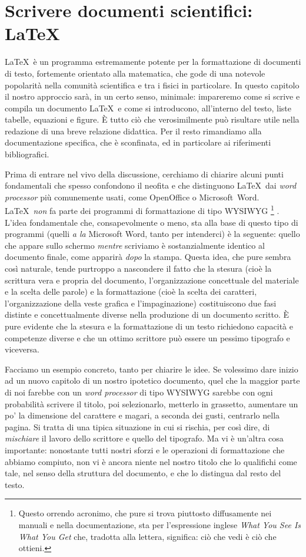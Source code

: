\section{Scrivere documenti scientifici: \LaTeX}
\label{sec:LaTeX}

\LaTeX\ \`e un programma estremamente potente per la formattazione di
documenti di testo, fortemente orientato alla matematica, che gode di
una notevole popolarit\`a nella comunit\`a scientifica e tra i fisici in
particolare.
In questo capitolo il nostro approccio sar\`a, in un certo senso, minimale:
impareremo come si scrive e compila un documento \LaTeX\ e come si introducono,
all'interno del testo, liste tabelle, equazioni e figure. \`E tutto ci\`o che
verosimilmente pu\`o risultare utile nella redazione di una breve relazione
didattica. Per il resto rimandiamo alla documentazione specifica, che \`e
sconfinata, ed in particolare ai riferimenti bibliografici.

Prima di entrare nel vivo della discussione, cerchiamo di chiarire alcuni
punti fondamentali che spesso confondono il neofita e che distinguono
\LaTeX\ dai \emph{word processor} pi\`u comunemente usati, come
OpenOffice o Microsoft~Word.
\LaTeX\ \emph{non} fa parte dei programmi di formattazione di tipo WYSIWYG%
\footnote{
Questo orrendo acronimo, che pure si trova piuttosto diffusamente nei manuali
e nella documentazione, sta per l'espressione inglese \emph{What You See Is
What You Get} che, tradotta alla lettera, significa: ci\`o che vedi \`e ci\`o
che ottieni.}%
. L'idea fondamentale che, consapevolmente o meno, sta alla base di questo tipo
di programmi (quelli \emph{a la} Microsoft Word, tanto per intenderci) \`e la
seguente: quello che appare sullo schermo \emph{mentre} scriviamo \`e
sostanzialmente identico al documento finale, come apparir\`a \emph{dopo}
la stampa. Questa idea, che pure sembra cos\`i naturale, tende purtroppo a
nascondere il fatto che la stesura (cio\`e la scrittura vera e propria del
documento, l'organizzazione concettuale del materiale e la scelta delle parole)
e la formattazione (cio\`e la scelta dei caratteri, l'organizzazione della
veste grafica e l'impaginazione) costituiscono due fasi distinte e
concettualmente diverse nella produzione di un documento scritto.
\`E pure evidente che la stesura e la formattazione di un testo richiedono
capacit\`a e competenze diverse e che un ottimo scrittore pu\`o essere un
pessimo tipografo e viceversa.

Facciamo un esempio concreto, tanto per chiarire le idee. Se volessimo dare
inizio ad un nuovo capitolo di un nostro ipotetico documento, quel che la
maggior parte di noi farebbe con un \emph{word processor} di tipo WYSIWYG
sarebbe con ogni probabilit\`a scrivere il titolo, poi selezionarlo, metterlo
in grassetto, aumentare un po' la dimensione del carattere e magari, a seconda
dei gusti, centrarlo nella pagina. Si tratta di una tipica situazione in cui
si rischia, per cos\`i dire, di \emph{mischiare} il lavoro dello scrittore e
quello del tipografo. Ma vi \`e un'altra cosa importante: nonostante
tutti nostri sforzi e le operazioni di formattazione che abbiamo compiuto,
non vi \`e ancora niente nel nostro titolo che lo qualifichi come tale,
nel senso della struttura del documento, e che lo distingua dal resto del
testo.

